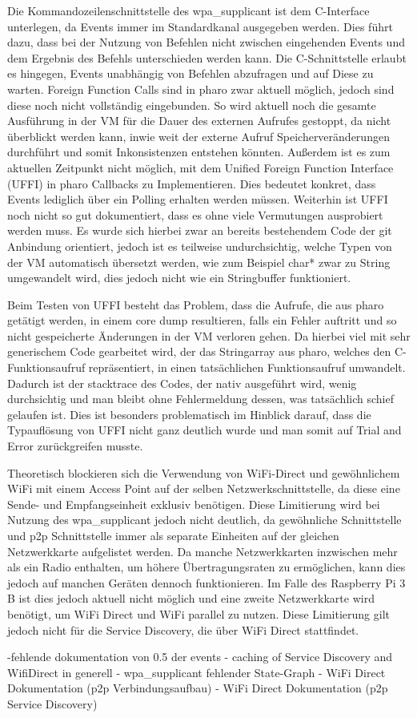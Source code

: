 		Die Kommandozeilenschnittstelle	des wpa\_supplicant ist dem C-Interface unterlegen, da Events immer im Standardkanal ausgegeben werden. Dies führt dazu, dass bei der Nutzung von Befehlen nicht zwischen eingehenden Events und dem Ergebnis des Befehls unterschieden werden kann. Die C-Schnittstelle erlaubt es hingegen, Events unabhängig von Befehlen abzufragen und auf Diese zu warten. Foreign Function Calls sind in pharo zwar aktuell möglich, jedoch sind diese noch nicht vollständig eingebunden. So wird aktuell noch die gesamte Ausführung in der VM für die Dauer des externen Aufrufes gestoppt, da nicht überblickt werden kann, inwie weit der externe Aufruf Speicherveränderungen durchführt und somit Inkonsistenzen entstehen könnten. Außerdem ist es zum aktuellen Zeitpunkt nicht möglich, mit dem Unified Foreign Function Interface (UFFI) in pharo Callbacks zu Implementieren. Dies bedeutet konkret, dass Events lediglich über ein Polling erhalten werden müssen.
		Weiterhin ist UFFI noch nicht so gut dokumentiert, dass es ohne viele Vermutungen ausprobiert werden muss. Es wurde sich hierbei zwar an bereits bestehendem Code der git Anbindung orientiert, jedoch ist es teilweise undurchsichtig, welche Typen von der VM automatisch übersetzt werden, wie zum Beispiel char* zwar zu String umgewandelt wird, dies jedoch nicht wie ein Stringbuffer funktioniert.
		
		Beim Testen von UFFI besteht das Problem, dass die Aufrufe, die aus pharo getätigt werden, in einem core dump resultieren, falls ein Fehler auftritt und so nicht gespeicherte Änderungen in der VM verloren gehen. Da hierbei viel mit sehr generischem Code gearbeitet wird, der das Stringarray aus pharo, welches den C-Funktionsaufruf repräsentiert, in einen tatsächlichen Funktionsaufruf umwandelt. Dadurch ist der stacktrace des Codes, der nativ ausgeführt wird, wenig durchsichtig und man bleibt ohne Fehlermeldung dessen, was tatsächlich schief gelaufen ist. Dies ist besonders problematisch im Hinblick darauf, dass die Typauflösung von UFFI nicht ganz deutlich wurde und man somit auf Trial and Error zurückgreifen musste.
		
		Theoretisch blockieren sich die Verwendung von WiFi-Direct und gewöhnlichem WiFi mit einem Access Point auf der selben Netzwerkschnittstelle, da diese eine Sende- und Empfangseinheit exklusiv benötigen. Diese Limitierung wird bei Nutzung des wpa\_supplicant jedoch nicht deutlich, da gewöhnliche Schnittstelle und p2p Schnittstelle immer als separate Einheiten auf der gleichen Netzwerkkarte aufgelistet werden. Da manche Netzwerkkarten inzwischen mehr als ein Radio enthalten, um höhere Übertragungsraten zu ermöglichen, kann dies jedoch auf manchen Geräten dennoch funktionieren. Im Falle des Raspberry Pi 3 B ist dies jedoch aktuell nicht möglich und eine zweite Netzwerkkarte wird benötigt, um WiFi Direct und WiFi parallel zu nutzen. Diese Limitierung gilt jedoch nicht für die Service Discovery, die über WiFi Direct stattfindet.
		
		-fehlende dokumentation von 0.5 der events
		- caching of Service Discovery and WifiDirect in generell
		- wpa\_supplicant fehlender State-Graph
		- WiFi Direct Dokumentation (p2p Verbindungsaufbau)
		- WiFi Direct Dokumentation (p2p Service Discovery)